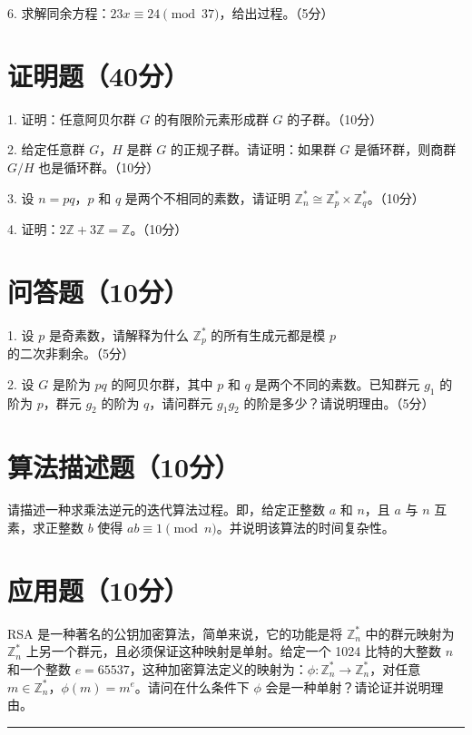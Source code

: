 \documentclass[12pt,a4paper]{article}
\begin{document}
6. 求解同余方程：$23x \equiv 24 \pmod{37}$，给出过程。（5分）

\section{证明题（40分）}

1. 证明：任意阿贝尔群 $G$ 的有限阶元素形成群 $G$ 的子群。（10分）

2. 给定任意群 $G$，$H$ 是群 $G$ 的正规子群。请证明：如果群 $G$ 是循环群，则商群 $G/H$ 也是循环群。（10分）

3. 设 $n=pq$，$p$ 和 $q$ 是两个不相同的素数，请证明 $\mathbb{Z}_n^* \cong \mathbb{Z}_p^* \times \mathbb{Z}_q^*$。（10分）

4. 证明：$2\mathbb{Z} + 3\mathbb{Z} = \mathbb{Z}$。（10分）

\section{问答题（10分）}

1. 设 $p$ 是奇素数，请解释为什么 $\mathbb{Z}_p^*$ 的所有生成元都是模 $p$ 的二次非剩余。（5分）

2. 设 $G$ 是阶为 $pq$ 的阿贝尔群，其中 $p$ 和 $q$ 是两个不同的素数。已知群元 $g_1$ 的阶为 $p$，群元 $g_2$ 的阶为 $q$，请问群元 $g_1g_2$ 的阶是多少？请说明理由。（5分）

\section{算法描述题（10分）}

请描述一种求乘法逆元的迭代算法过程。即，给定正整数 $a$ 和 $n$，且 $a$ 与 $n$ 互素，求正整数 $b$ 使得 $ab \equiv 1 \pmod{n}$。并说明该算法的时间复杂性。

\section{应用题（10分）}

RSA 是一种著名的公钥加密算法，简单来说，它的功能是将 $\mathbb{Z}_n^*$ 中的群元映射为 $\mathbb{Z}_n^*$ 上另一个群元，且必须保证这种映射是单射。给定一个 1024 比特的大整数 $n$ 和一个整数 $e=65537$，这种加密算法定义的映射为：$\phi: \mathbb{Z}_n^* \to \mathbb{Z}_n^*$，对任意 $m \in \mathbb{Z}_n^*$，$\phi(m) = m^e$。请问在什么条件下 $\phi$ 会是一种单射？请论证并说明理由。

\vspace{20pt}
\hrule
\vspace{10pt}
\end{document}

